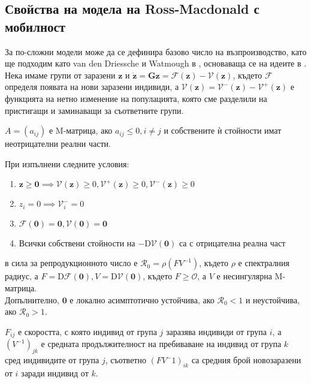 \subsection{Свойства на модела на Ross-Macdonald с мобилност}
За по-сложни модели може да се дефинира базово число на възпроизводство, като ще подходим като van den Driessche и Watmough в \cite{Driessche2002}, основаваща се на идеите в \cite{Diekmann1990}.
Нека имаме групи от заразени $\mathbf{z}$ и $\dot{\mathbf{z}} = \mathbf{G}{\mathbf{z}} = \mathscr{F}(\mathbf{z}) - \mathscr{V}(\mathbf{z})$, където $\mathscr{F}$ определя появата на нови заразени индивиди, а $\mathscr{V}(\mathbf{z}) = \mathscr{V}^-(\mathbf{z}) - \mathscr{V}^+(\mathbf{z})$ е функцията на нетно изменение на популацията, която сме разделили на пристигащи и заминаващи за съответните групи.

\begin{definition}[M-матрица]
  $A = (a_{ij})$ е M-матрица, ако $a_{ij} \leq 0, i \neq j$ и собствените ѝ стойности имат неотрицателни реални части.
\end{definition}

\begin{theorem} \cite[теорема~2]{Driessche2002}
  При изпълнени следните условия:
  \begin{enumerate}
    \item $\mathbf{z} \geq \mathbf{0} \implies \mathscr{V}(\mathbf{z}) \geq 0, \mathscr{V}^+(\mathbf{z}) \geq 0, \mathscr{V}^-(\mathbf{z}) \geq 0$
    \item $z_i = 0 \implies \mathscr{V}_{i}^- = 0$
    \item $\mathscr{F}(\mathbf{0}) = \mathbf{0}, \mathscr{V}(\mathbf{0}) = \mathbf{0}$
    \item Всички собствени стойности на $-\mathrm{D}\mathscr{V}{(\boldsymbol{0})}$ са с отрицателна реална част
    \end{enumerate}
  в сила за репродукционното число е $\mathscr{R}_0 = \rho(F V^{-1})$, където $\rho$ е спектралния радиус, а $F = \mathrm{D} \mathscr{F}(\mathbf{0}), V = \mathrm{D} \mathscr{V}(\mathbf{0})$, където $F \geq \mathscr{O}$, а $V$ е несингулярна M-матрица. \\
  Допълнително, $\mathbf{0}$ е локално асимптотично устойчива, ако $\mathscr{R}_0 < 1$ и неустойчива, ако $\mathscr{R}_0 > 1$.
\end{theorem}

$F_{ij}$ е скоростта, с която индивид от група $j$ заразява индивиди от група $i$, а $(V^{-1})_{jk}$ е средната продължителност на пребиваване на индивид от група $k$ сред индивидите от група $j$, съответно $(F V^-1)_{ik}$ са средния брой новозаразени от $i$ заради индивид от $k$.

